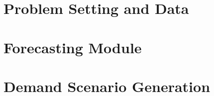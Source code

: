 \documentclass[11pt]{article}
\begin{document}
\section{Problem Setting and Data}\label{sec:data}

\section{Forecasting Module}\label{sec:forecast}

\section{Demand Scenario Generation}\label{sec:scenarios}
\end{document}
